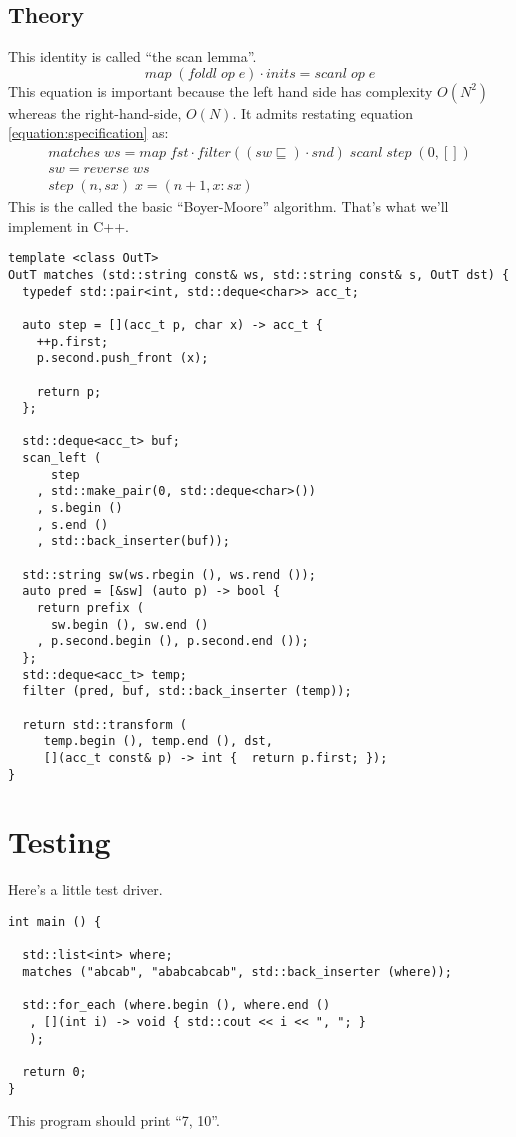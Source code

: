 \documentclass{article}
\begin{document}
\subsection{Theory}
This identity is called ``the scan lemma''.
\begin{equation}
map\;(foldl\;op\;e) \cdot inits = scanl\;op\;e
\end{equation}
This equation is important because the left hand side has complexity
\(O(N^{2})\) whereas the right-hand-side, \(O(N)\). It admits
restating equation \ref{equation:specification} as:
\begin{gather}
matches\;ws = map\;fst \cdot filter ((sw \sqsubseteq) \cdot snd)\;scanl\; step\;(0, []) \nonumber\\
sw = reverse\;ws \nonumber\\
step\;(n, sx)\;x = (n + 1, x:sx)
\end{gather}
This is the called the basic ``Boyer-Moore'' algorithm. That's what
we'll implement in C++.
\begin{verbatim}
template <class OutT>
OutT matches (std::string const& ws, std::string const& s, OutT dst) {
  typedef std::pair<int, std::deque<char>> acc_t;

  auto step = [](acc_t p, char x) -> acc_t {
    ++p.first;
    p.second.push_front (x);

    return p;
  };

  std::deque<acc_t> buf;
  scan_left (
      step
    , std::make_pair(0, std::deque<char>())
    , s.begin ()
    , s.end ()
    , std::back_inserter(buf));

  std::string sw(ws.rbegin (), ws.rend ());
  auto pred = [&sw] (auto p) -> bool { 
    return prefix (
      sw.begin (), sw.end ()
    , p.second.begin (), p.second.end ()); 
  };
  std::deque<acc_t> temp;
  filter (pred, buf, std::back_inserter (temp));

  return std::transform (
     temp.begin (), temp.end (), dst, 
     [](acc_t const& p) -> int {  return p.first; });
}
\end{verbatim}
\section{Testing}
Here's a little test driver.
\begin{verbatim}
int main () {

  std::list<int> where;
  matches ("abcab", "ababcabcab", std::back_inserter (where));

  std::for_each (where.begin (), where.end ()
   , [](int i) -> void { std::cout << i << ", "; }
   );  

  return 0;
}
\end{verbatim}
This program should print ``7, 10''.
\end{document}

